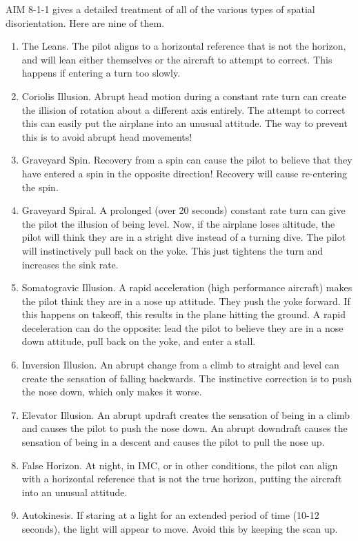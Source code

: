 AIM 8-1-1 gives a detailed treatment of all of the various types of spatial disorientation. Here are nine of them.

\begin{enumerate}

\item The Leans. The pilot aligns to a horizontal reference that is not the horizon, and will lean either themselves or the aircraft to attempt to correct. This happens if entering a turn too slowly.
\item Coriolis Illusion. Abrupt head motion during a constant rate turn can create the illision of rotation about a different axis entirely. The attempt to correct this can easily put the airplane into an unusual attitude. The way to prevent this is to avoid abrupt head movements!
\item Graveyard Spin. Recovery from a spin can cause the pilot to believe that they have entered a spin in the opposite direction! Recovery will cause re-entering the spin.
\item Graveyard Spiral. A prolonged (over 20 seconds) constant rate turn can give the pilot the illusion of being level. Now, if the airplane loses altitude, the pilot will think they are in a stright dive instead of a turning dive. The pilot will instinctively pull back on the yoke. This just tightens the turn and increases the sink rate.
\item Somatogravic Illusion. A rapid acceleration (high performance aircraft) makes the pilot think they are in a nose up attitude. They push the yoke forward. If this happens on takeoff, this results in the plane hitting the ground. A rapid deceleration can do the opposite: lead the pilot to believe they are in a nose down attitude, pull back on the yoke, and enter a stall.
\item Inversion Illusion. An abrupt change from a climb to straight and level can create the sensation of falling backwards. The instinctive correction is to push the nose down, which only makes it worse.
\item Elevator Illusion. An abrupt updraft creates the sensation of being in a climb and causes the pilot to push the nose down. An abrupt downdraft causes the sensation of being in a descent and causes the pilot to pull the nose up.
\item False Horizon. At night, in IMC, or in other conditions, the pilot can align with a horizontal reference that is not the true horizon, putting the aircraft into an unusual attitude.
\item Autokinesis. If staring at a light for an extended period of time (10-12 seconds), the light will appear to move. Avoid this by keeping the scan up.
\end{enumerate}

